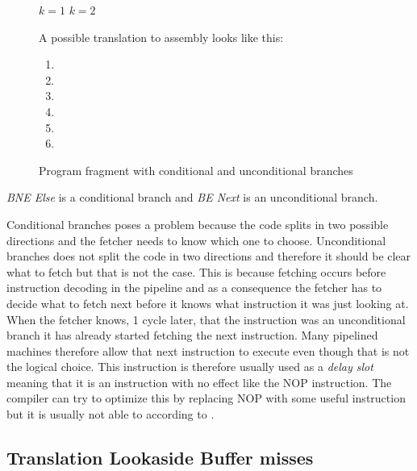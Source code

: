\begin{figure}
\begin{algorithmic}
	\State $k = 1$
\Else
	\State $k = 2$
\EndIf
\end{algorithmic}
\vspace{0.3cm}
\noindent
A possible translation to assembly looks like this:
\vspace{0.3cm}
\begin{enumerate}
\item \itab{ }  
\item \itab{ }  
\item {}  
\item \itab{ }  
\item {}  
\item {}
\end{enumerate}
\caption{Program fragment with conditional and unconditional branches}
\label{fig:branchexample}
\end{figure}

\noindent \textit{BNE Else} is a conditional branch and \textit{BE Next} is an unconditional branch. 

Conditional branches poses a problem because the code splits in two possible directions and the fetcher needs to know which one to choose.
Unconditional branches does not split the code in two directions and therefore it should be clear what to fetch but that is not the case.
This is because fetching occurs before instruction decoding in the pipeline and as a consequence the fetcher has to decide what to fetch next before it knows what instruction it was just looking at.
When the fetcher knows, 1 cycle later, that the instruction was an unconditional branch it has already started fetching the next instruction.
Many pipelined machines therefore allow that next instruction to execute even though that is not the logical choice. This instruction is therefore usually used as a \textit{delay slot} meaning that it is an instruction with no effect like the NOP instruction.
The compiler can try to optimize this by replacing NOP with some useful instruction but it is usually not able to according to \citep[Section 4.5.2]{Tanenbaum}.



\subsection{Translation Lookaside Buffer misses}

